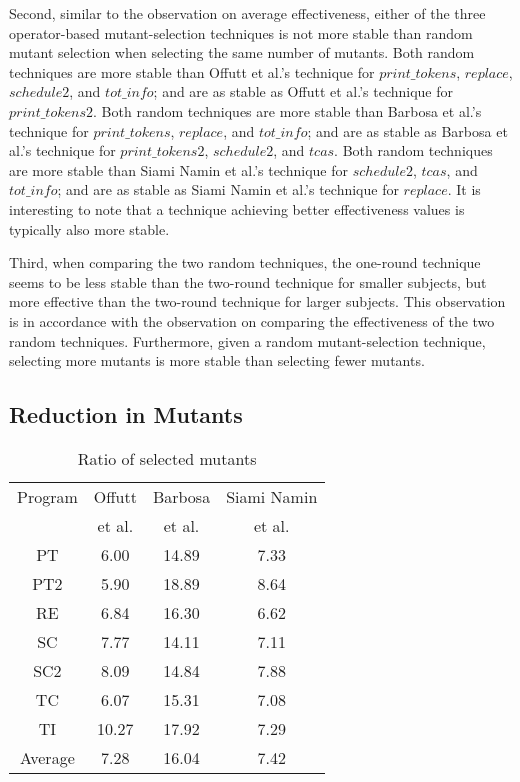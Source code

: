 Second, similar to the observation on average effectiveness,
either of the three operator-based mutant-selection techniques is
not more stable than random mutant selection when selecting the
same number of mutants. Both random techniques are more stable
than Offutt et al.'s technique for $print\_tokens$, $replace$,
$schedule2$, and $tot\_info$; and are as stable as Offutt et al.'s
technique for $print\_tokens2$. Both random techniques are more
stable than Barbosa et al.'s technique for $print\_tokens$,
$replace$, and $tot\_info$; and are as stable as Barbosa et al.'s
technique for $print\_tokens2$,  $schedule2$, and $tcas$. Both
random techniques are more stable than Siami Namin et al.'s
technique for $schedule2$, $tcas$, and $tot\_info$; and are as
stable as Siami Namin et al.'s technique for $replace$. It is
interesting to note that a technique achieving better
effectiveness values is typically also more stable.

Third, when comparing the two random techniques, the one-round
technique seems to be less stable than the two-round technique for
smaller subjects, but more effective than the two-round technique
for larger subjects. This observation is in accordance with the
observation on comparing the effectiveness of the two
random techniques. Furthermore, given a random mutant-selection
technique, selecting more mutants is more stable than selecting
fewer mutants.


\vspace{-1.5ex}
\subsection{Reduction in Mutants}
\label{Reduction}


\begin{table}[t]
\caption{\label{tab:Reduction} Ratio of selected mutants}
\centering \hspace*{-0.1cm}
\begin{tabular}{|c|c|c|c|}
  \hline
  Program & Offutt  &Barbosa  & Siami Namin \\
  ~ & et al. & et al.  &  et al.\\
  \hline
  \hline
  PT&6.00 &14.89 &7.33\\
  \hline
  PT2&5.90 &18.89 &8.64\\
  \hline
  RE&6.84 &16.30 &6.62\\
  \hline
  SC&7.77 &14.11 &7.11\\
  \hline
  SC2&8.09 &14.84 &7.88\\
  \hline
  TC&6.07 &15.31 &7.08\\
  \hline
  TI&10.27 &17.92 &7.29\\
  \hline
  \hline
  Average&7.28 &16.04 &7.42\\
  \hline
\end{tabular}
\vspace{-4ex}
\end{table}

